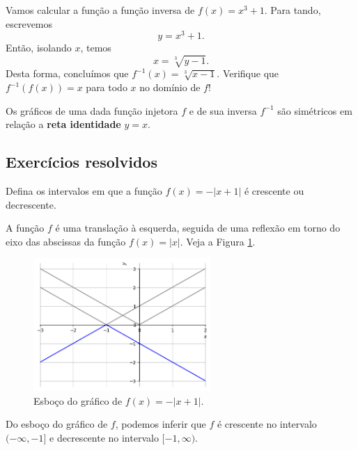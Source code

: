 \begin{ex}
  Vamos calcular a função a função inversa de $f(x) = x^3 + 1$. Para tando, escrevemos
  \begin{equation}
    y = x^3 + 1.
  \end{equation}
  Então, isolando $x$, temos
  \begin{equation}
    x = \sqrt[3]{y - 1}.
  \end{equation}
  Desta forma, concluímos que $f^{-1}(x) = \sqrt[3]{x-1}$. Verifique que $f^{-1}(f(x)) = x$ para todo $x$ no domínio de $f$!
\end{ex}

\begin{obs}
 Os gráficos de uma dada função injetora $f$ e de sua inversa $f^{-1}$ são simétricos em relação a {\bf reta identidade} $y=x$.
\end{obs}

\subsection*{Exercícios resolvidos}

\begin{exeresol}
  Defina os intervalos em que a função $f(x) = -|x+1|$ é crescente ou decrescente.
\end{exeresol}
\begin{resol}
  A função $f$ é uma translação à esquerda, seguida de uma reflexão em torno do eixo das abscissas da função $f(x) = |x|$. Veja a Figura \ref{fig:exeresol_funprop_mono}.

  \begin{figure}[H]
    \centering
    \includegraphics[width=0.6\textwidth]{./cap_funcao/dados/fig_exeresol_funprop_mono/fig_exeresol_funprop_mono.png}
    \caption{Esboço do gráfico de $f(x) = -|x+1|$.}
    \label{fig:exeresol_funprop_mono}
  \end{figure}

  Do esboço do gráfico de $f$, podemos inferir que $f$ é crescente no intervalo $(-\infty, -1]$ e decrescente no intervalo $[-1, \infty)$.
\end{resol}

